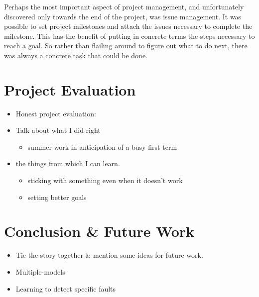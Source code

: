 \documentclass[11pt, a4paper]{report}
\begin{document}
Perhaps the most important aspect of project management, and
unfortunately discovered only towards the end of the project, was
issue management. It was possible to set project milestones and attach
the issues necessary to complete the milestone. This has the benefit
of putting in concrete terms the steps necessary to reach a goal. So
rather than flailing around to figure out what to do next, there was
always a concrete task that could be done.

\chapter{Project Evaluation}
\label{cha:project-evaluation}

\begin{itemize}
\item Honest project evaluation:
\item Talk about what I did right
  \begin{itemize}
  \item summer work in anticipation of a busy first term
  \end{itemize}
\item the things from which I can learn.
  \begin{itemize}
  \item sticking with something even when it doesn't work
  \item setting better goals
  \end{itemize}
\end{itemize}

\chapter{Conclusion \& Future Work}
\label{cha:conclusion}

\begin{itemize}
\item Tie the story together \& mention some ideas for future
  work.
\item Multiple-models
\item Learning to detect specific faults
\end{itemize}



\end{document}
